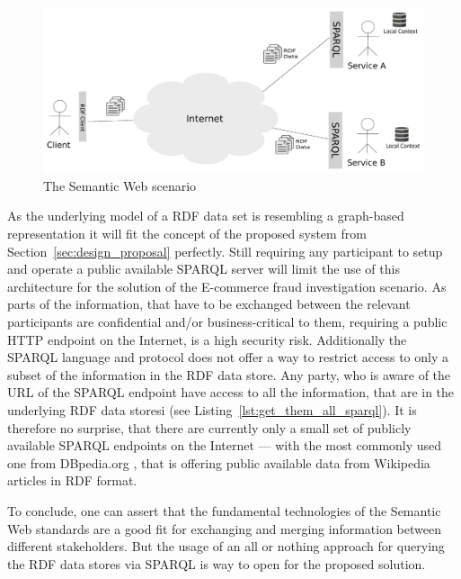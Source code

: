 \begin{figure}[H]
  \centering
  \includegraphics[width=0.9\columnwidth]{images/web-data-scenario.pdf}
  \caption{The Semantic Web scenario}
\label{fig:web_data_scenario}
\end{figure}

As the underlying model of a \gls{RDF} data set is resembling a graph-based representation it will fit the concept of the proposed system from Section~\ref{sec:design_proposal} perfectly. Still requiring any participant to setup and operate a public available \gls{SPARQL} server will limit the use of this architecture for the solution of the \gls{E-commerce} fraud investigation scenario. As parts of the information, that have to be exchanged between the relevant participants are confidential and/or business-critical to them, requiring a public \gls{HTTP} endpoint on the Internet, is a high security risk. Additionally the \gls{SPARQL} language and protocol does not offer a way to restrict access to only a subset of the information in the \gls{RDF} data store. Any party, who is aware of the \gls{URL} of the \gls{SPARQL} endpoint have access to all the information, that are in the underlying \gls{RDF} data storesi (see Listing~\ref{lst:get_them_all_sparql}). It is therefore no surprise, that there are currently only a small set of publicly available \gls{SPARQL} endpoints on the Internet --- with the most commonly used one from DBpedia.org \citep{dbPedia.org}, that is offering public available data from Wikipedia articles in \gls{RDF} format. \@


To conclude, one can assert that the fundamental technologies of the Semantic Web standards are a good fit for exchanging and merging information between different stakeholders. But the usage of an all or nothing approach for querying the \gls{RDF} data stores via \gls{SPARQL} is way to open for the proposed solution.


